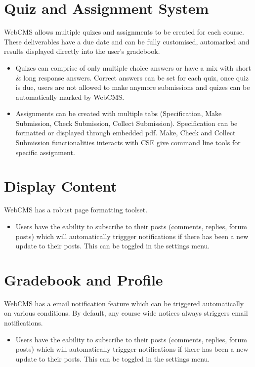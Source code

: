 \section{Quiz and Assignment System}
WebCMS allows multiple quizes and assignments to be created for each course. These deliverables have a due date and can be fully customised, automarked and results displayed directly into the user's gradebook.
\begin{itemize}
\item Quizes can comprise of only multiple choice answers or have a mix with short \& long response answers. Correct answers can be set for each quiz, once quiz is due, users are not allowed to make anymore submissions and quizes can be automatically marked by WebCMS.
\item Assignments can be created with multiple tabs (Specification, Make Submission, Check Submission, Collect Submission). Specification can be formatted or displayed through embedded pdf. Make, Check and Collect Submission functionalities interacts with CSE give command line tools for specific assignment.
\end{itemize}

\section{Display Content}
WebCMS has a robust page formatting toolset.
\begin{itemize}
\item Users have the eability to subscribe to their posts (comments, replies, forum posts) which will automatically triggger notifications if there has been a new update to their posts. This can be toggled in the settings menu.
\end{itemize}

\section{Gradebook and Profile}
WebCMS has a email notification feature which can be triggered automatically on various conditions. By default, any course wide notices always striggers email notifications.
\begin{itemize}
\item Users have the eability to subscribe to their posts (comments, replies, forum posts) which will automatically triggger notifications if there has been a new update to their posts. This can be toggled in the settings menu.
\end{itemize}

